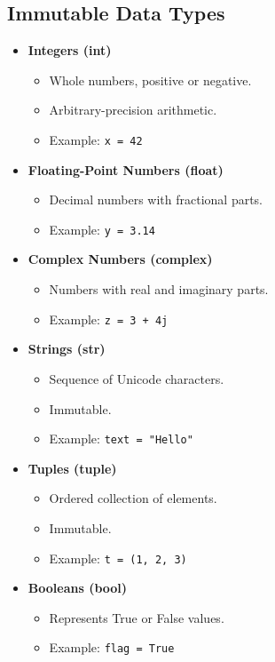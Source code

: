 \documentclass{article}
\begin{document}
\subsection{Immutable Data Types}
\begin{itemize}
    \item \textbf{Integers (int)}
    \begin{itemize}
        \item Whole numbers, positive or negative.
        \item Arbitrary-precision arithmetic.
        \item Example: \texttt{x = 42}
    \end{itemize}
    \item \textbf{Floating-Point Numbers (float)}
    \begin{itemize}
        \item Decimal numbers with fractional parts.
        \item Example: \texttt{y = 3.14}
    \end{itemize}
    \item \textbf{Complex Numbers (complex)}
    \begin{itemize}
        \item Numbers with real and imaginary parts.
        \item Example: \texttt{z = 3 + 4j}
    \end{itemize}
    \item \textbf{Strings (str)}
    \begin{itemize}
        \item Sequence of Unicode characters.
        \item Immutable.
        \item Example: \texttt{text = "Hello"}
    \end{itemize}
    \item \textbf{Tuples (tuple)}
    \begin{itemize}
        \item Ordered collection of elements.
        \item Immutable.
        \item Example: \texttt{t = (1, 2, 3)}
    \end{itemize}
    \item \textbf{Booleans (bool)}
    \begin{itemize}
        \item Represents True or False values.
        \item Example: \texttt{flag = True}
    \end{itemize}
\end{itemize}
\end{document}

